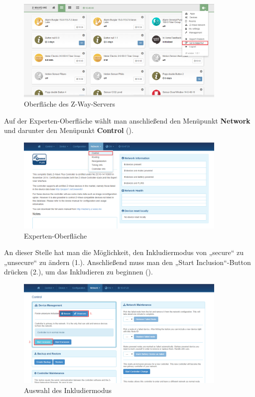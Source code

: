 \begin{figure}[h!]
	\centering
	\includegraphics[width=0.9\textwidth]{img/Sensorevaluation/PhilioConf2.png}
	\caption{Oberfläche des Z-Way-Servers}
	\label{fig:sensorenPhilioConf2}
\end{figure}

Auf der Experten-Oberfläche wählt man anschließend den Menüpunkt \textbf{Network} und darunter den Menüpunkt \textbf{Control} ().

\begin{figure}[h!]
	\centering
	\includegraphics[width=0.9\textwidth]{img/Sensorevaluation/PhilioConf3.png}
	\caption{Experten-Oberfläche}
	\label{fig:sensorenPhilioConf3}
\end{figure}

An dieser Stelle hat man die Möglichkeit, den Inkludiermodus von „secure“ zu „unsecure“ zu ändern (1.). Anschließend muss man den „Start Inclusion“-Button drücken (2.), um das Inkludieren zu beginnen (). 

\begin{figure}[h!]
	\centering
	\includegraphics[width=0.9\textwidth]{img/Sensorevaluation/PhilioConf4.png}
	\caption{Auswahl des Inkludiermodus}
	\label{fig:sensorenPhilioConf4}
\end{figure}

